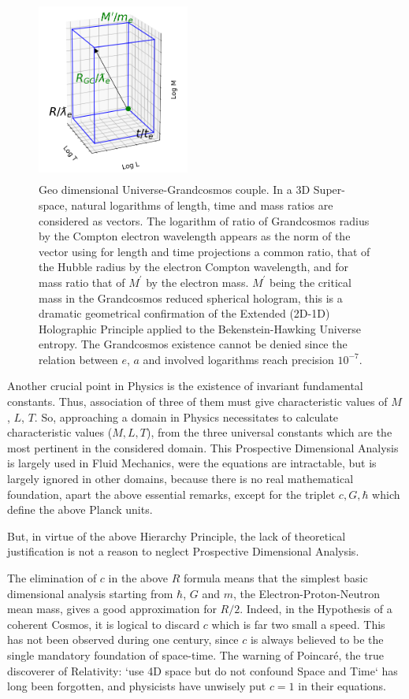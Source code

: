 \documentclass[twoside,draft]{article}
\begin{document}
\begin{sloppypar}
\begin{figure}[h]
\centering
\includegraphics[width=5cm,height=6cm]{./figures/triaxis.png}
\caption{Geo dimensional Universe-Grandcosmos couple. In a 3D Super-space, natural logarithms of length, time and mass ratios are considered as vectors. The logarithm of ratio of Grandcosmos radius by the Compton electron wavelength appears as the norm of the vector using for length and time projections a common ratio, that of the Hubble radius by the electron Compton wavelength, and for mass ratio that of $M^{\prime}$ by the electron mass. $M^{\prime}$ being the critical mass in the Grandcosmos reduced spherical hologram, this is a dramatic geometrical confirmation of the Extended (2D-1D) Holographic Principle applied to the Bekenstein-Hawking Universe entropy. The Grandcosmos existence cannot be denied since the relation between $e$, $a$ and involved logarithms reach precision $10^{-7}$.} 
\end{figure}

Another crucial point in Physics is the existence of invariant fundamental constants. Thus,
association of three of them must give characteristic values of $M$, $L$, $T$. So, approaching a domain in
Physics necessitates to calculate characteristic values ($M, L, T$), from the three universal constants
which are the most pertinent in the considered domain. This Prospective Dimensional Analysis is
largely used in Fluid Mechanics, were the equations are intractable, but is largely ignored in other
domains, because there is no real mathematical foundation, apart the above essential remarks, except for the triplet $c, G, \hbar$ which define the above Planck units. 

But, in virtue of the above Hierarchy Principle, the lack of theoretical justification is not a reason to
neglect Prospective Dimensional Analysis. 

The elimination of $c$ in the above $R$ formula means that the simplest basic dimensional
analysis starting from $\hbar$, $G$ and $m$, the Electron-Proton-Neutron mean mass, gives a good
approximation for $R/2$. Indeed, in the Hypothesis of a coherent Cosmos, it is logical to discard $c$
which is far two small a speed. This has not been observed during one century, since $c$ is always
believed to be the single mandatory foundation of space-time. The warning of Poincar\'{e}, the true
discoverer of Relativity: `use 4D space but do not confound Space and Time` has long been
forgotten, and physicists have unwisely put $c = 1$ in their equations.


\end{sloppypar}
\end{document}
